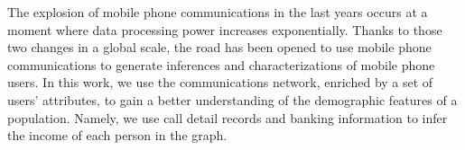 The explosion of mobile phone communications in the last years occurs at a moment where data processing power increases exponentially.  Thanks to those two changes in a global scale, the road has been opened to use mobile phone communications to generate inferences and characterizations of mobile phone users.
In this work, we use the communications network, enriched by a set of users' attributes, to gain a better understanding of the demographic features of a population. Namely, we use
call detail records and banking information to infer the income of each person in the graph.


